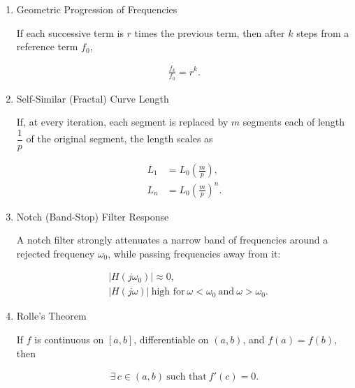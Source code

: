 

\begin{enumerate}[label=\thesubsection.\arabic*,ref=\thesubsection.\theenumi]
\item Geometric Progression of Frequencies

If each successive term is $r$ times the previous term, then after
$k$ steps from a reference term $f_0$,

\begin{align}
\frac{f_k}{f_0}=r^{k}. \label{GP}
\end{align}


\item Self-Similar (Fractal) Curve Length

If, at every iteration, each segment is replaced by $m$ segments each
of length $\dfrac{1}{p}$ of the original segment, the length scales as

\begin{align}
L_1&=L_0\left(\frac{m}{p}\right),\\
L_n&=L_0\left(\frac{m}{p}\right)^{n}. \label{iteration}
\end{align}


\item Notch (Band-Stop) Filter Response

A notch filter strongly attenuates a narrow band of frequencies around
a rejected frequency $\omega_0$, while passing frequencies away from
it:

\begin{align}
&|H(j\omega_0)|\approx 0, \\
&|H(j\omega)|\ \text{high for}\ \omega<\omega_0\ \text{and}\ \omega>\omega_0. \label{freq}
\end{align}

\item Rolle's Theorem \label{rolle's}

If $f$ is continuous on $[a,b]$, differentiable on $(a,b)$, and
$f(a)=f(b)$, then

\begin{align}
\exists\, c\in(a,b)\ \text{such that}\ f'(c)=0.
\end{align}


\end{enumerate}
